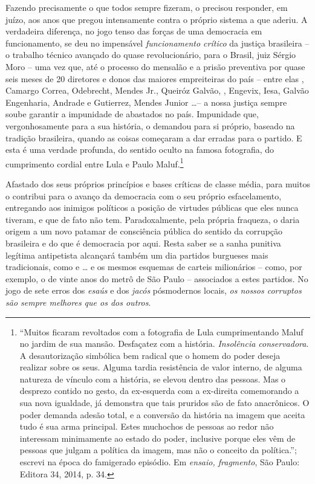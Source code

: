 Fazendo precisamente o que todos sempre fizeram, o  precisou
responder, em juízo, aos anos que pregou intensamente contra o próprio
sistema a que aderiu. A verdadeira diferença, no jogo tenso das forças
de uma democracia em funcionamento, se deu no impensável
\emph{funcionamento crítico} da justiça brasileira -- o trabalho técnico
avançado do quase revolucionário, para o Brasil, juiz Sérgio Moro -- uma
vez que, até o processo do mensalão e a prisão preventiva por quase seis
meses de 20 diretores e donos das maiores empreiteiras do país -- entre
elas , Camargo Correa, Odebrecht, Mendes Jr., Queiróz Galvão, ,
Engevix, Iesa, Galvão Engenharia, Andrade e Gutierrez, Mendes Junior
…-- a nossa justiça sempre soube garantir a impunidade de abastados no
país. Impunidade que, vergonhosamente para a sua história, o  demandou
para si próprio, baseado na tradição brasileira, quando as coisas
começaram a dar erradas para o partido. E esta é uma verdade profunda,
do sentido oculto na famosa fotografia, do cumprimento cordial entre
Lula e Paulo Maluf.\footnote{``Muitos ficaram revoltados com a
  fotografia de Lula cumprimentando Maluf no jardim de sua mansão.
  Desfaçatez com a história. \emph{Insolência conservadora}. A
  desautorização simbólica bem radical que o homem do poder deseja
  realizar sobre os seus. Alguma tardia resistência de valor interno, de
  alguma natureza de vínculo com a história, se elevou dentro das
  pessoas. Mas o desprezo contido no gesto, da ex-esquerda com a
  ex-direita comemorando a sua nova igualdade, já demonstra que tais
  pruridos são de fato anacrônicos. O poder demanda adesão total, e a
  conversão da história na imagem que aceita tudo é sua arma principal.
  Estes muchochos de pessoas ao redor não interessam minimamente ao
  estado do poder, inclusive porque eles vêm de pessoas que julgam a
  política da imagem, mas não o conceito da política.''; escrevi na
  época do famigerado episódio. Em \emph{ensaio, fragmento}, São Paulo:
  Editora 34, 2014, p. 34.}

Afastado dos seus próprios princípios e bases críticas de classe média,
para muitos o  contribui para o avanço da democracia com o seu próprio
esfacelamento, entregando aos inimigos políticos a posição de virtudes
públicas que eles nunca tiveram, e que de fato não tem. Paradoxalmente,
pela própria fraqueza, o  daria origem a um novo patamar de
consciência pública do sentido da corrupção brasileira e do que é
democracia por aqui. Resta saber se a sanha punitiva legítima
antipetista alcançará também um dia partidos burgueses mais
tradicionais, como  e … e os mesmos esquemas de carteis
milionários -- como, por exemplo, o de vinte anos do metrô de São Paulo
-- associados a estes partidos. No jogo de sete erros dos \emph{esaús} e
dos \emph{jacós} pósmodernos locais, \emph{os nossos corruptos são
sempre melhores que os dos outros}.

